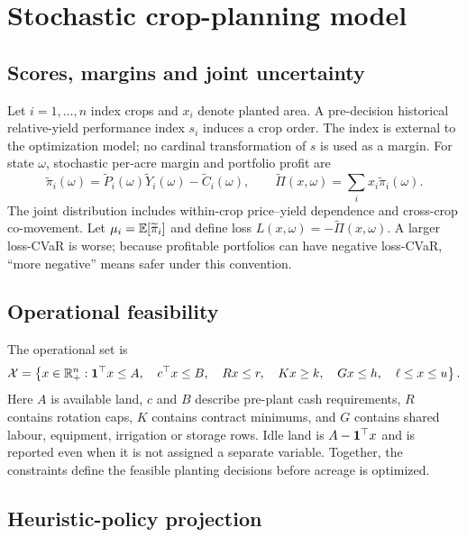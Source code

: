 \section{Stochastic crop-planning model}

\subsection{Scores, margins and joint uncertainty}

Let \(i=1,\ldots,n\) index crops and \(x_i\) denote planted area. A
pre-decision historical relative-yield performance index \(s_i\) induces a
crop order. The index is external to the optimization model; no cardinal
transformation of \(s\) is used as a margin.
For state \(\omega\), stochastic per-acre margin and portfolio profit are
\begin{equation}
\widetilde\pi_i(\omega)=\widetilde P_i(\omega)\widetilde
Y_i(\omega)-\widetilde C_i(\omega),\qquad
\widetilde\Pi(x,\omega)=\sum_i x_i\widetilde\pi_i(\omega).
\end{equation}
The joint distribution includes within-crop price--yield dependence and
cross-crop co-movement. Let \(\mu_i=\mathbb E[\widetilde\pi_i]\) and define loss
\(L(x,\omega)=-\widetilde\Pi(x,\omega)\). A larger loss-CVaR is worse; because
profitable portfolios can have negative loss-CVaR, ``more negative'' means
safer under this convention.

\subsection{Operational feasibility}

The operational set is
\begin{equation}
\mathcal X=\left\{x\in\mathbb R_+^n:
\mathbf 1^\top x\le A,\quad c^\top x\le B,\quad
Rx\le r,\quad Kx\ge k,\quad Gx\le h,\quad
\ell\le x\le u\right\}.
\label{eq:operations}
\end{equation}
Here \(A\) is available land, \(c\) and \(B\) describe pre-plant cash
requirements, \(R\) contains rotation caps, \(K\) contains contract minimums,
and \(G\) contains shared labour, equipment, irrigation or storage rows. Idle
land is \(A-\mathbf 1^\top x\) and is reported even when it is not assigned a
separate variable. Together, the constraints define the feasible planting
decisions before acreage is optimized.

\subsection{Heuristic-policy projection}


